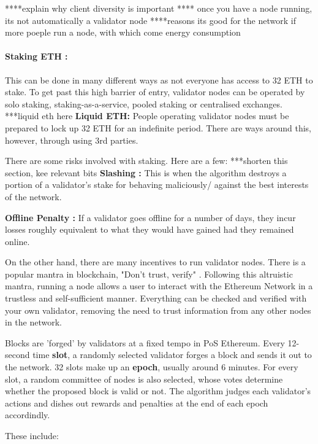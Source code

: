  ****explain why client diversity is important
 **** once you have a node running, its not automatically a validator node
****reasons its good for the network if more poeple run a node, with which come energy consumption
 
\paragraph{Staking ETH :}
This can be done in many different ways as not everyone has access to 32 ETH to stake. To get past this high barrier of entry, validator nodes can be operated by solo staking, staking-as-a-service, pooled staking or centralised exchanges. ***liquid eth here
\textbf{Liquid ETH: }
People operating validator nodes must be prepared to lock up 32 ETH for an indefinite period. There are ways around this, however, through using 3rd parties. 

There are some risks involved with staking. Here are a few:
 ***shorten this section, kee relevant bits
\textbf{Slashing :}
This is when the algorithm destroys a portion of a validator's stake for behaving maliciously/ against the best interests of the network.

\textbf{Offline Penalty :}
If a validator goes offline for a number of days, they incur losses roughly equivalent to what they would have gained had they remained online. 


\newline \newline
On the other hand, there are many incentives to run validator nodes. There is a popular mantra in blockchain, "Don't trust, verify" \cite{EthereumEthereum.org}. Following this altruistic mantra, running a node allows a user to interact with the Ethereum Network in a trustless and self-sufficient manner. Everything can be checked and verified with your own validator, removing the need to trust information from any other nodes in the network. 

Blocks are 'forged' by validators at a fixed tempo in PoS Ethereum. Every 12-second time \textbf{slot}, a randomly selected validator forges a block and sends it out to the network. 32 slots make up an \textbf{epoch}, usually around 6 minutes. For every slot, a random committee of nodes is also selected, whose votes determine whether the proposed block is valid or not. The algorithm judges each validator's actions and dishes out rewards and penalties at the end of each epoch accordindly. 


These include:


